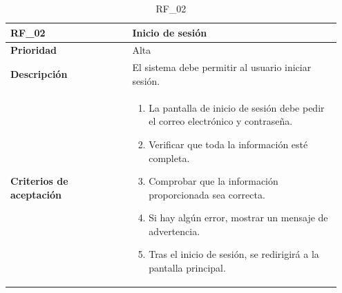 \begin{table}[htb!]
    \begin{tabular}{|p{0.35\linewidth}|p{0.6\linewidth}|}
        \hline
        \rowcolor[HTML]{C0C0C0}  
        \textbf{RF\_02} & \textbf{Inicio de sesión} \\
        \hline
        \textbf{Prioridad} & Alta \\
        \hline
        \textbf{Descripción} & El sistema debe permitir al usuario iniciar sesión.  \\
        \hline
        \vspace{0.5mm}
        \textbf{Criterios de aceptación} & 
        \begin{minipage}[t]{0.9\linewidth}
            \begin{enumerate}
                \item La pantalla de inicio de sesión debe pedir el correo electrónico y contraseña.
                \item Verificar que toda la información esté completa.
                \item Comprobar que la información proporcionada sea correcta.
                \item Si hay algún error, mostrar un mensaje de advertencia.
                \item Tras el inicio de sesión, se redirigirá a la pantalla principal.
            \end{enumerate}
            \vspace{2mm}
        \end{minipage} \\
        \hline
    \end{tabular}
    \caption{RF\_02}
    \label{req:RF02}
\end{table}


